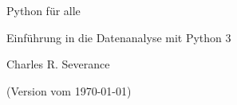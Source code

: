 \begin{titlepage}
\begin{center}
\vspace*{30mm}

\sffamily
\LARGE
Python für alle

\large
Einführung in die Datenanalyse mit Python 3

\vspace{15mm}

\large
Charles R. Severance

\vspace{10cm}

\normalsize
(Version vom \today)

\end{center}
\end{titlepage}

\normalsize
\normalfont
